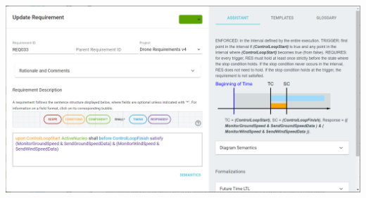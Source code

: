 \documentclass[11pt, aspectratio=169, table]{beamer}
\begin{document}
\begin{frame}
\centering
\includegraphics[width=\textwidth]{images/Drone-REQ033.png}
\end{frame}
\end{document}
